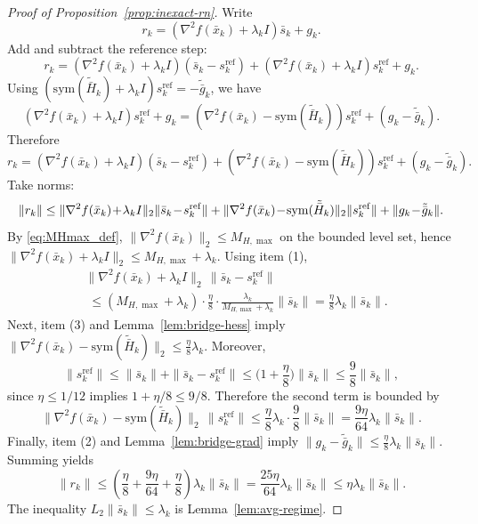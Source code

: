\documentclass[11pt,a4paper]{article}
\begin{document}
\begin{proof}[Proof of Proposition~\ref{prop:inexact-rn}]
Write
\[
r_k=(\nabla^2 f(\bar x_k)+\lambda_k I)\bar s_k+g_k.
\]
Add and subtract the reference step:
\[
r_k=(\nabla^2 f(\bar x_k)+\lambda_k I)(\bar s_k-s_k^{\mathrm{ref}})
+(\nabla^2 f(\bar x_k)+\lambda_k I)s_k^{\mathrm{ref}}+g_k.
\]
Using $(\mathrm{sym}(\tilde{\bar H}_k)+\lambda_k I)s_k^{\mathrm{ref}}=-\tilde{\bar g}_k$, we have
\[
(\nabla^2 f(\bar x_k)+\lambda_k I)s_k^{\mathrm{ref}}+g_k
=(\nabla^2 f(\bar x_k)-\mathrm{sym}(\tilde{\bar H}_k))s_k^{\mathrm{ref}}+(g_k-\tilde{\bar g}_k).
\]
Therefore
\[
r_k=(\nabla^2 f(\bar x_k)+\lambda_k I)(\bar s_k-s_k^{\mathrm{ref}})
+(\nabla^2 f(\bar x_k)-\mathrm{sym}(\tilde{\bar H}_k))s_k^{\mathrm{ref}}+(g_k-\tilde{\bar g}_k).
\]
Take norms:
\[
\|r_k\|
\le \|\nabla^2 f(\bar x_k)\!+\!\lambda_k I\|_2\|\bar s_k\!-\!s_k^{\mathrm{ref}}\|\\
+\|\nabla^2 f(\bar x_k)\!-\!\mathrm{sym}(\tilde{\bar H}_k)\|_2\|s_k^{\mathrm{ref}}\|
+\|g_k\!-\!\tilde{\bar g}_k\|.
\]
By \eqref{eq:MHmax_def}, $\|\nabla^2 f(\bar x_k)\|_2\le M_{H,\max}$ on the bounded level set, hence
$\|\nabla^2 f(\bar x_k)+\lambda_k I\|_2\le M_{H,\max}+\lambda_k$.
Using item (1),
\begin{align*}
&\|\nabla^2 f(\bar x_k)\!+\!\lambda_k I\|_2\,\|\bar s_k\!-\!s_k^{\mathrm{ref}}\|\\
&\;\le (M_{H,\max}\!+\!\lambda_k)\!\cdot\!\tfrac{\eta}{8}\!\cdot\!\tfrac{\lambda_k}{M_{H,\max}+\lambda_k}\|\bar s_k\|
=\tfrac{\eta}{8}\lambda_k\|\bar s_k\|.
\end{align*}
Next, item (3) and Lemma~\ref{lem:bridge-hess} imply
$\|\nabla^2 f(\bar x_k)-\mathrm{sym}(\tilde{\bar H}_k)\|_2\le \frac{\eta}{8}\lambda_k$.
Moreover,
\[
\|s_k^{\mathrm{ref}}\|\le \|\bar s_k\|+\|\bar s_k-s_k^{\mathrm{ref}}\|
\le \Big(1+\frac{\eta}{8}\Big)\|\bar s_k\|\le \frac98\|\bar s_k\|,
\]
since $\eta\le 1/12$ implies $1+\eta/8\le 9/8$.
Therefore the second term is bounded by
\[
\|\nabla^2 f(\bar x_k)-\mathrm{sym}(\tilde{\bar H}_k)\|_2\,\|s_k^{\mathrm{ref}}\|
\le \frac{\eta}{8}\lambda_k\cdot \frac98\|\bar s_k\|=\frac{9\eta}{64}\lambda_k\|\bar s_k\|.
\]
Finally, item (2) and Lemma~\ref{lem:bridge-grad} imply $\|g_k-\tilde{\bar g}_k\|\le \frac{\eta}{8}\lambda_k\|\bar s_k\|$.
Summing yields
\[
\|r_k\|\le \left(\frac{\eta}{8}+\frac{9\eta}{64}+\frac{\eta}{8}\right)\lambda_k\|\bar s_k\|
=\frac{25\eta}{64}\lambda_k\|\bar s_k\|\le \eta\lambda_k\|\bar s_k\|.
\]
The inequality $L_2\|\bar s_k\|\le \lambda_k$ is Lemma~\ref{lem:avg-regime}.
\end{proof}
\end{document}
